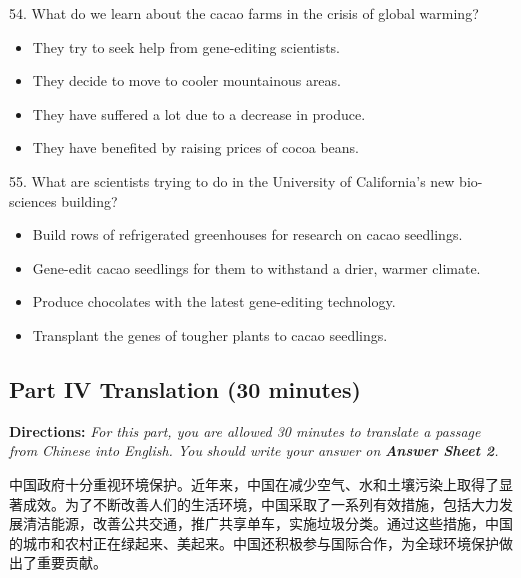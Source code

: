\documentclass[UTF8,11pt]{ctexart}
\begin{document}
54. What do we learn about the cacao farms in the crisis of global warming?


\begin{itemize}[leftmargin=2em,itemsep=.2em,topsep=.4em]\item[A.] They try to seek help from gene-editing scientists.
\item[B.] They decide to move to cooler mountainous areas.
\item[C.] They have suffered a lot due to a decrease in produce.
\item[D.] They have benefited by raising prices of cocoa beans.
\end{itemize}

55. What are scientists trying to do in the University of California’s new bio-sciences building?


\begin{itemize}[leftmargin=2em,itemsep=.2em,topsep=.4em]\item[A.] Build rows of refrigerated greenhouses for research on cacao seedlings.
\item[B.] Gene-edit cacao seedlings for them to withstand a drier, warmer climate.
\item[C.] Produce chocolates with the latest gene-editing technology.
\item[D.] Transplant the genes of tougher plants to cacao seedlings.
\end{itemize}

\subsection*{\textbf{Part IV Translation (30 minutes)}}


\textbf{Directions: }\textit{For this part, you are allowed 30 minutes to translate a passage from Chinese into English. You} \textit{should write your answer on }\textbf{\textit{Answer Sheet 2}}\textit{.}


中国政府十分重视环境保护。近年来，中国在减少空气、水和土壤污染上取得了显著成效。为了不断改善人们的生活环境，中国采取了一系列有效措施，包括大力发展清洁能源，改善公共交通，推广共享单车，实施垃圾分类。通过这些措施，中国的城市和农村正在绿起来、美起来。中国还积极参与国际合作，为全球环境保护做出了重要贡献。
\end{document}
